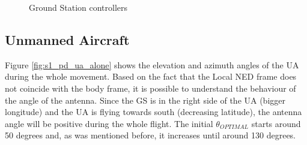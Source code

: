 \begin{figure}[H]
	\hfill
	\hfill
	\caption{Ground Station controllers}
	\label{fig:s1_gs}
\end{figure}

\subsection{Unmanned Aircraft}
Figure \ref{fig:s1_pd_ua_alone} shows the elevation and azimuth angles of the UA during the whole movement. Based on the fact that the Local NED frame does not coincide with the body frame, it is possible to understand the behaviour of the angle of the antenna. Since the GS is in the right side of the UA (bigger longitude) and the UA is flying towards south (decreasing latitude), the antenna angle will be positive during the whole flight.
The initial $\theta_{OPTIMAL}$ starts around 50 degrees and, as was mentioned before, it increases until around 130 degrees.

